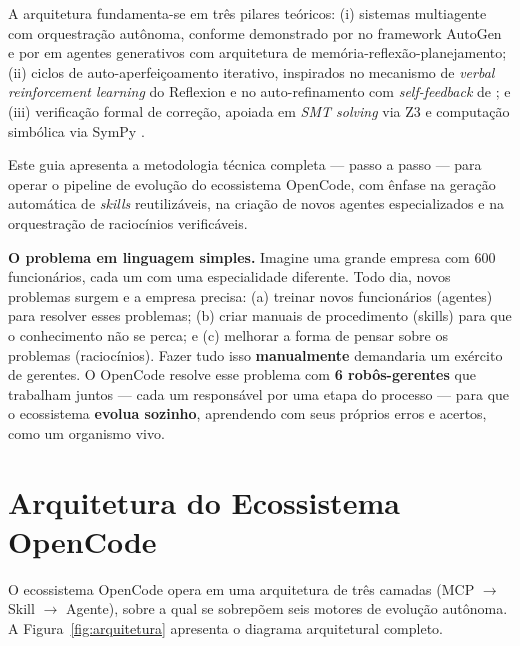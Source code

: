 \documentclass[
  article,
  12pt,
  oneside,
  a4paper,
  brazil,
  sumario=tradicional
]{abntex2}
\begin{document}
A arquitetura fundamenta-se em três pilares teóricos: (i) sistemas multiagente com orquestração autônoma, conforme demonstrado por  no framework AutoGen e por  em agentes generativos com arquitetura de memória-reflexão-planejamento; (ii) ciclos de auto-aperfeiçoamento iterativo, inspirados no mecanismo de \emph{verbal reinforcement learning} do Reflexion \cite{shinn2023reflexion} e no auto-refinamento com \emph{self-feedback} de ; e (iii) verificação formal de correção, apoiada em \emph{SMT solving} via Z3 \cite{demoura2008z3} e computação simbólica via SymPy \cite{meurer2017sympy}.

Este guia apresenta a metodologia técnica completa --- passo a passo --- para operar o pipeline de evolução do ecossistema OpenCode, com ênfase na geração automática de \emph{skills} reutilizáveis, na criação de novos agentes especializados e na orquestração de raciocínios verificáveis.

\begin{leigosbox}
\textbf{O problema em linguagem simples.} Imagine uma grande empresa com 600 funcionários, cada um com uma especialidade diferente. Todo dia, novos problemas surgem e a empresa precisa: (a) treinar novos funcionários (agentes) para resolver esses problemas; (b) criar manuais de procedimento (skills) para que o conhecimento não se perca; e (c) melhorar a forma de pensar sobre os problemas (raciocínios). Fazer tudo isso \textbf{manualmente} demandaria um exército de gerentes. O OpenCode resolve esse problema com \textbf{6 robôs-gerentes} que trabalham juntos --- cada um responsável por uma etapa do processo --- para que o ecossistema \textbf{evolua sozinho}, aprendendo com seus próprios erros e acertos, como um organismo vivo.
\end{leigosbox}

\section{Arquitetura do Ecossistema OpenCode}

O ecossistema OpenCode opera em uma arquitetura de três camadas (MCP $\rightarrow$ Skill $\rightarrow$ Agente), sobre a qual se sobrepõem seis motores de evolução autônoma. A Figura~\ref{fig:arquitetura} apresenta o diagrama arquitetural completo.
\end{document}
